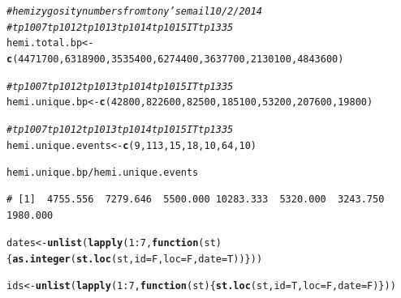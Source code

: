 \documentclass{article}\usepackage[]{graphicx}\usepackage[]{color}
\makeatletter
\newcommand{\hlnum}[1]{\textcolor[rgb]{0.686,0.059,0.569}{#1}}%
\newcommand{\hlcom}[1]{\textcolor[rgb]{0.678,0.584,0.686}{\textit{#1}}}%
\newcommand{\hlopt}[1]{\textcolor[rgb]{0,0,0}{#1}}%
\newcommand{\hlstd}[1]{\textcolor[rgb]{0.345,0.345,0.345}{#1}}%
\newcommand{\hlkwa}[1]{\textcolor[rgb]{0.161,0.373,0.58}{\textbf{#1}}}%
\newcommand{\hlkwb}[1]{\textcolor[rgb]{0.69,0.353,0.396}{#1}}%
\newcommand{\hlkwc}[1]{\textcolor[rgb]{0.333,0.667,0.333}{#1}}%
\newcommand{\hlkwd}[1]{\textcolor[rgb]{0.737,0.353,0.396}{\textbf{#1}}}%
\newenvironment{kframe}{%
 \def\at@end@of@kframe{}%
 \ifinner\ifhmode%
  \def\at@end@of@kframe{\end{minipage}}%
  \begin{minipage}{\columnwidth}%
 \fi\fi%
 \def\FrameCommand##1{\hskip\@totalleftmargin \hskip-\fboxsep
 \colorbox{shadecolor}{##1}\hskip-\fboxsep
     \hskip-\linewidth \hskip-\@totalleftmargin \hskip\columnwidth}%
 \MakeFramed {\advance\hsize-\width
   \@totalleftmargin\z@ \linewidth\hsize
   \@setminipage}}%
 {\par\unskip\endMakeFramed%
 \at@end@of@kframe}
\newenvironment{knitrout}{}{} %
\makeatother
\begin{document}
\begin{knitrout}\footnotesize
{}\color{fgcolor}\begin{kframe}
\begin{alltt}
\hlcom{# hemizygosity numbers from tony's email 10/2/2014}
\hlcom{#                  tp1007   tp1012     tp1013  tp1014   tp1015       IT   tp1335 }
\hlstd{hemi.total.bp} \hlkwb{<-} \hlkwd{c}\hlstd{(}\hlnum{4471700}\hlstd{,} \hlnum{6318900}\hlstd{,} \hlnum{3535400}\hlstd{,} \hlnum{6274400}\hlstd{,} \hlnum{3637700}\hlstd{,} \hlnum{2130100}\hlstd{,} \hlnum{4843600}\hlstd{)}

\hlcom{#                  tp1007  tp1012 tp1013  tp1014  tp1015     IT  tp1335 }
\hlstd{hemi.unique.bp} \hlkwb{<-} \hlkwd{c}\hlstd{(}\hlnum{42800}\hlstd{,} \hlnum{822600}\hlstd{,} \hlnum{82500}\hlstd{,} \hlnum{185100}\hlstd{,} \hlnum{53200}\hlstd{,} \hlnum{207600}\hlstd{,} \hlnum{19800}\hlstd{)}

\hlcom{#                     tp1007 tp1012 tp1013 tp1014 tp1015  IT tp1335 }
\hlstd{hemi.unique.events} \hlkwb{<-} \hlkwd{c}\hlstd{(}\hlnum{9}\hlstd{,}    \hlnum{113}\hlstd{,}     \hlnum{15}\hlstd{,}     \hlnum{18}\hlstd{,}  \hlnum{10}\hlstd{,}   \hlnum{64}\hlstd{,} \hlnum{10}\hlstd{)}

\hlstd{hemi.unique.bp}\hlopt{/}\hlstd{hemi.unique.events}
\end{alltt}
\begin{verbatim}
# [1]  4755.556  7279.646  5500.000 10283.333  5320.000  3243.750  1980.000
\end{verbatim}
\begin{alltt}
\hlstd{dates} \hlkwb{<-} \hlkwd{unlist}\hlstd{(}\hlkwd{lapply}\hlstd{(}\hlnum{1}\hlopt{:}\hlnum{7}\hlstd{,}\hlkwa{function}\hlstd{(}\hlkwc{st}\hlstd{)\{}\hlkwd{as.integer}\hlstd{(}\hlkwd{st.loc}\hlstd{(st,}\hlkwc{id}\hlstd{=F,}\hlkwc{loc}\hlstd{=F,}\hlkwc{date}\hlstd{=T))\}))}

\hlstd{ids} \hlkwb{<-} \hlkwd{unlist}\hlstd{(}\hlkwd{lapply}\hlstd{(}\hlnum{1}\hlopt{:}\hlnum{7}\hlstd{,}\hlkwa{function}\hlstd{(}\hlkwc{st}\hlstd{)\{}\hlkwd{st.loc}\hlstd{(st,}\hlkwc{id}\hlstd{=T,}\hlkwc{loc}\hlstd{=F,}\hlkwc{date}\hlstd{=F)\}))}
\end{alltt}
\end{kframe}
\end{knitrout}
\end{document}
